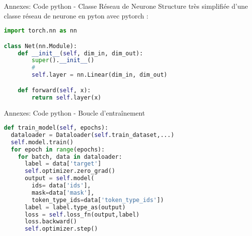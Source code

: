 \documentclass[12pt]{beamer}
\begin{document}
\begin{frame}[fragile]{Annexes: Code python - Classe Réseau de Neurone}
\footnotesize
Structure très simplifiée d'une classe réseau de neurone en pyton avec pytorch : 
\begin{tcolorbox}[colback=white,boxsep=2mm,arc=1pt,
    auto outer arc,left=1mm,right=1mm,top=1mm,bottom=1mm,boxrule=0.5pt,width=\textwidth]
\begin{lstlisting}[language=python]
import torch.nn as nn

class Net(nn.Module):  
    def __init__(self, dim_in, dim_out):
        super().__init__()
        #
        self.layer = nn.Linear(dim_in, dim_out)

    def forward(self, x):
        return self.layer(x)
\end{lstlisting}
\end{tcolorbox}
\normalsize
\end{frame}



\begin{frame}[fragile]{Annexes: Code python - Boucle d'entraînement}
\vspace{-7px}

\footnotesize
\begin{tcolorbox}[colback=white,boxsep=2mm,arc=1pt,
    auto outer arc,left=1mm,right=1mm,top=1mm,bottom=1mm,boxrule=0.5pt,width=\textwidth]

\begin{minipage}{\textwidth * 1 / 11}
\begin{lstlisting}[language=python]
def train_model(self, epochs):
  dataloader = Dataloader(self.train_dataset,...)
  self.model.train()
  for epoch in range(epochs):
    for batch, data in dataloader:
      label = data['target']
      self.optimizer.zero_grad()
      output = self.model(
        ids= data['ids'],
        mask=data['mask'],
        token_type_ids=data['token_type_ids'])
      label = label.type_as(output)
      loss = self.loss_fn(output,label)
      loss.backward()
      self.optimizer.step()
\end{lstlisting}

\end{minipage}
\end{tcolorbox}
\normalsize
\end{frame}



\end{document}

